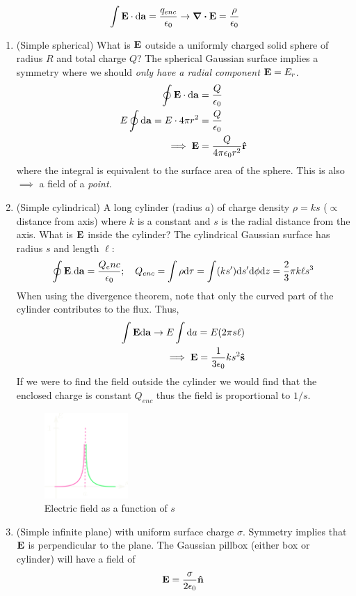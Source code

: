 \documentclass[../main.tex]{subfiles}
\begin{document}
\[\int \vb E \cdot \dd\vb a = \frac{q_{enc}}{\epsilon_0} \to \div \vb E = \frac{\rho}{\epsilon_0}\]
\begin{enumerate}
    \item (Simple spherical) What is $\vb E$ outside a uniformly charged solid sphere of radius $R$ and total charge $Q$? The spherical Gaussian surface implies a symmetry where we should \emph{only have a radial component} $\vb E = E_r$.
    \begin{align*}
        \oint \vb E \cdot \dd \vb a &= \frac{Q}{\epsilon_0} \\
        E \oint \dd \vb a = E \cdot 4\pi r^2 &= \frac{Q}{\epsilon_0} \\
        \implies \vb E &= \frac{Q}{4\pi\epsilon_0 r^2} \vu r
    \end{align*}
    where the integral is equivalent to the surface area of the sphere. This is also $\implies$ a field of a \emph{point}.
    \item (Simple cylindrical) A long cylinder (radius $a$) of charge density $\rho = ks$ ($\propto$ distance from axis) where $k$ is a constant and $s$ is the radial distance from the axis. What is $\vb E$ inside the cylinder?
    The cylindrical Gaussian surface has radius $s$ and length $\ell$:
    \begin{align*}
        \oint \vb E _\cdot \dd\vb a = \frac{Q_enc}{\epsilon_0}; \quad Q_{enc} = \int \rho \dd \tau = \int (ks') \dd s' \dd \phi \dd z = \frac{2}{3} \pi k \ell s^3
    \end{align*}
    When using the divergence theorem, note that only the curved part of the cylinder contributes to the flux. Thus,
    \begin{align*}
        \int \vb E \dd \vb a \to E\int \dd a = E (2\pi s \ell) \\
        \implies \vb E = \frac{1}{3\epsilon_0} ks^2 \vu s
    \end{align*}
    If we were to find the field outside the cylinder we would find that the enclosed charge is constant $Q_{enc}$ thus the field is proportional to $1/s$.
    \begin{figure} [ht]
        \centering
        \includegraphics[width=0.3\textwidth]{fig2_3.png}
        \caption{Electric field as a function of $s$}
    \end{figure}
    \item (Simple infinite plane) with uniform surface charge $\sigma$. Symmetry implies that $\vb E$ is perpendicular to the plane.
    The Gaussian pillbox (either box or cylinder) will have a field of
    \[\vb E = \frac{\sigma}{2\epsilon_0} \vu n \]
\end{enumerate}
\end{document}
